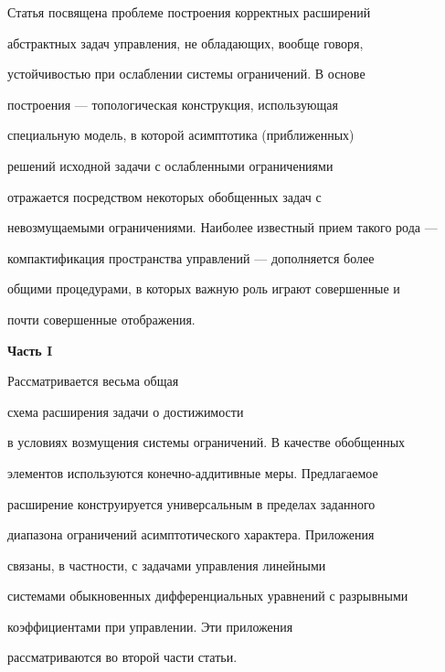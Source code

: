 Статья посвящена проблеме построения корректных расширений


абстрактных задач управления, не обладающих, вообще говоря,


устойчивостью при ослаблении системы ограничений. В основе


построения --- топологическая конструкция, использующая


специальную модель, в которой асимптотика (приближенных)


решений исходной задачи с ослабленными ограничениями


отражается посредством некоторых обобщенных задач с


невозмущаемыми ограничениями. Наиболее известный прием такого рода ---


компактификация пространства управлений --- дополняется более


общими процедурами, в которых важную роль играют совершенные и


почти совершенные отображения.


\medskip





\begin{center}


{\large{\bf Часть I}}


\end{center}


\medskip





Рассматривается весьма общая


схема расширения задачи о достижимости


в условиях возмущения системы ограничений. В качестве обобщенных


элементов используются конечно-аддитивные меры. Предлагаемое


расширение конструируется универсальным в пределах заданного


диапазона ограничений асимптотического характера. Приложения


связаны, в частности, с задачами управления линейными


системами обыкновенных дифференциальных уравнений с разрывными


коэффициентами при управлении. Эти приложения


рассматриваются во второй части статьи.





